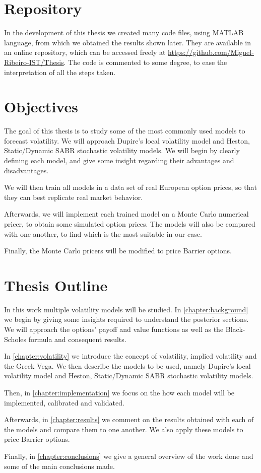 \section{Repository}
In the development of this thesis we created many code files, using MATLAB language, from which we obtained the results shown later. They are available in an online repository, which can be accessed freely at \url{https://github.com/Miguel-Ribeiro-IST/Thesis}.
The code is commented to some degree, to ease the interpretation of all the steps taken.

\section{Objectives}
The goal of this thesis is to study some of the most commonly used models to forecast volatility. We will approach Dupire's local volatility model and Heston, Static/Dynamic SABR stochastic volatility models. We will begin by clearly defining each model, and give some insight regarding their advantages and disadvantages.

We will then train all models in a data set of real European option prices, so that they can best replicate real market behavior.

Afterwards, we will implement each trained model on a Monte Carlo numerical pricer, to obtain some simulated option prices. The models will also be compared with one another, to find which is the most suitable in our case.

Finally, the Monte Carlo pricers will be modified to price Barrier options.

\section{Thesis Outline}
In this work multiple volatility models will be studied.
In \autoref{chapter:background} we begin by giving some insights required to understand the posterior sections. We will approach the options' payoff and value functions as well as the Black-Scholes formula and consequent results.

In \autoref{chapter:volatility} we introduce the concept of volatility, implied volatility and the Greek Vega. We then describe the models to be used, namely Dupire's local volatility model and Heston, Static/Dynamic SABR stochastic volatility models.

Then, in \autoref{chapter:implementation} we focus on the how each model will be implemented, calibrated and validated.

Afterwards, in \autoref{chapter:results} we comment on the results obtained with each of the models and compare them to one another. We also apply these models to price Barrier options.

Finally, in \autoref{chapter:conclusions} we give a general overview of the work done and some of the main conclusions made.